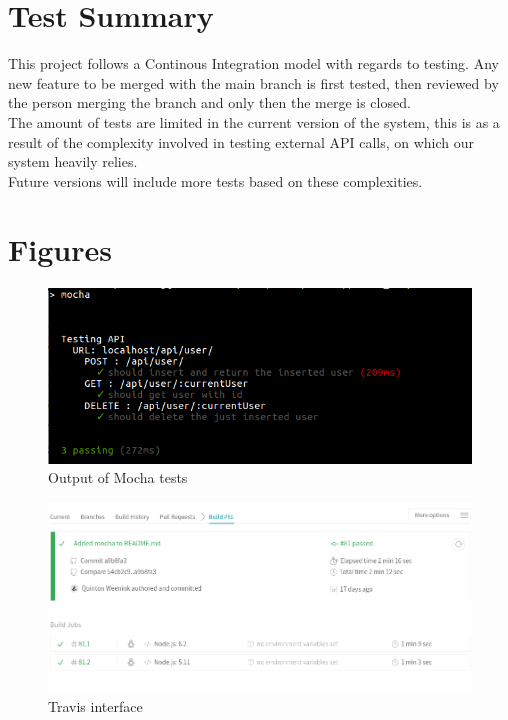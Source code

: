 \documentclass{article}
\begin{document}
\section{Test Summary}
This project follows a Continous Integration model with regards to testing. Any new feature to be merged with the main branch is first tested, then reviewed by the person merging the branch and only then the merge is closed.\\
The amount of tests are limited in the current version of the system, this is as a result of the complexity involved in testing external API calls, on which our system heavily relies.\\
Future versions will include more tests based on these complexities.


\cleardoublepage
\section{Figures}
\begin{figure}[H]
  \centering
      \includegraphics[width=\textwidth]{images/tests.png}
  \caption{Output of Mocha tests}
  \label{fig:MochaTests}
\end{figure}

\begin{figure}[h]
  \centering
      \includegraphics[width=\textwidth]{images/TravisInterface.png}
  \caption{Travis interface}
\end{figure}
\end{document}

